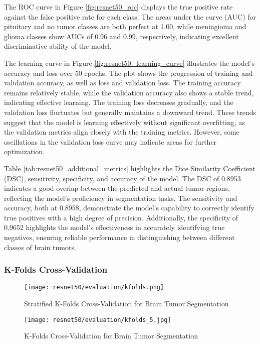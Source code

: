 The ROC curve in Figure \ref{fig:resnet50_roc} displays the true positive rate against the false positive rate for each class. The areas under the curve (AUC) for pituitary and no tumor classes are both perfect at 1.00, while meningioma and glioma classes show AUCs of 0.96 and 0.99, respectively, indicating excellent discriminative ability of the model.

The learning curve in Figure \ref{fig:resnet50_learning_curve} illustrates the model's accuracy and loss over 50 epochs. The plot shows the progression of training and validation accuracy, as well as loss and validation loss. The training accuracy remains relatively stable, while the validation accuracy also shows a stable trend, indicating effective learning. The training loss decreases gradually, and the validation loss fluctuates but generally maintains a downward trend. These trends suggest that the model is learning effectively without significant overfitting, as the validation metrics align closely with the training metrics. However, some oscillations in the validation loss curve may indicate areas for further optimization.

Table \ref{tab:resnet50_additional_metrics} highlights the Dice Similarity Coefficient (DSC), sensitivity, specificity, and accuracy of the model. The DSC of 0.8953 indicates a good overlap between the predicted and actual tumor regions, reflecting the model's proficiency in segmentation tasks. The sensitivity and accuracy, both at 0.8958, demonstrate the model's capability to correctly identify true positives with a high degree of precision. Additionally, the specificity of 0.9652 highlights the model's effectiveness in accurately identifying true negatives, ensuring reliable performance in distinguishing between different classes of brain tumors.

\subsubsection{K-Folds Cross-Validation}

\begin{figure}[H]
  \begin{center}
    \texttt{[image: resnet50/evaluation/kfolds.png]}
  \end{center}
  \caption{Stratified K-Folds Cross-Validation for Brain Tumor Segmentation}\label{f:resnet50_kfolds}
\end{figure}

\begin{figure}[H]
  \begin{center}
    \texttt{[image: resnet50/evaluation/kfolds\_5.jpg]}
  \end{center}
  \caption{K-Folds Cross-Validation for Brain Tumor Segmentation}\label{f:resnet50_kfolds_5}
\end{figure}

